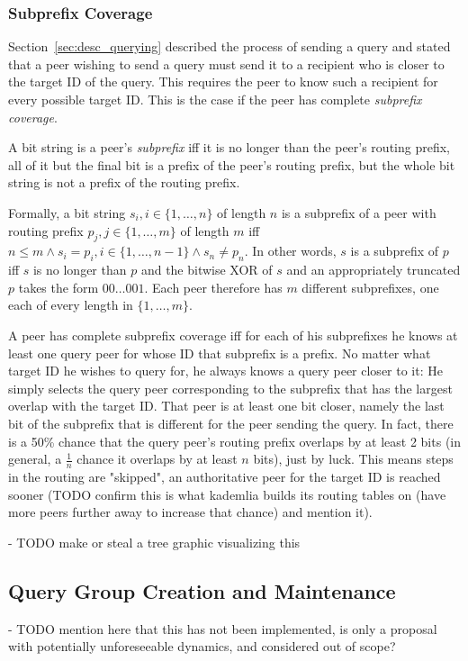 \subsubsection{Subprefix Coverage}
Section~\ref{sec:desc_querying} described the process of sending a query and
stated that a peer wishing to send a query must send it to a recipient who is
closer to the target ID of the query. This requires the peer to know such a
recipient for every possible target ID. This is the case if the peer has
complete \emph{subprefix coverage}.

A bit string is a peer's \emph{subprefix} iff it is no longer than the peer's
routing prefix, all of it but the final bit is a prefix of the peer's routing
prefix, but the whole bit string is not a prefix of the routing prefix.

Formally, a bit string $s_i, i \in \{1, \ldots, n\}$ of length $n$ is a
subprefix of a peer with routing prefix $p_j, j \in \{1, \ldots, m\}$ of length
$m$ iff $n \leq m \land s_i = p_i, i \in \{1, \ldots, n - 1\} \land s_n \neq
p_n$. In other words, $s$ is a subprefix of $p$ iff $s$ is no longer than $p$
and the bitwise XOR of $s$ and an appropriately truncated $p$ takes the form
$00\ldots001$. Each peer therefore has $m$ different subprefixes, one each of
every length in $\{1, \ldots, m\}$.

A peer has complete subprefix coverage iff for each of his subprefixes he knows
at least one query peer for whose ID that subprefix is a prefix. No matter what
target ID he wishes to query for, he always knows a query peer closer to it: He
simply selects the query peer corresponding to the subprefix that has the
largest overlap with the target ID. That peer is at least one bit closer, namely
the last bit of the subprefix that is different for the peer sending the query.
In fact, there is a 50\% chance that the query peer's routing prefix overlaps by
at least 2 bits (in general, a $\frac{1}{n}$ chance it overlaps by at least $n$
bits), just by luck. This means steps in the routing are "skipped", an
authoritative peer for the target ID is reached sooner (TODO confirm this is
what kademlia builds its routing tables on (have more peers further away to
increase that chance) and mention it).

- TODO make or steal a tree graphic visualizing this

\subsection{Query Group Creation and Maintenance}
- TODO mention here that this has not been implemented, is only a proposal with
  potentially unforeseeable dynamics, and considered out of scope?

